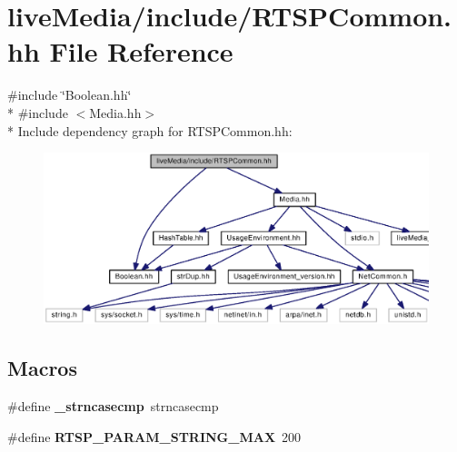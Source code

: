 \section{live\+Media/include/\+R\+T\+S\+P\+Common.hh File Reference}
\label{RTSPCommon_8hh}
{\ttfamily \#include \char`\"{}Boolean.\+hh\char`\"{}}\\*
{\ttfamily \#include $<$Media.\+hh$>$}\\*
Include dependency graph for R\+T\+S\+P\+Common.\+hh\+:
\nopagebreak
\begin{figure}[H]
\begin{center}
\leavevmode
\includegraphics[width=350pt]{RTSPCommon_8hh__incl}
\end{center}
\end{figure}
\subsection*{Macros}
\begin{DoxyCompactItemize}
\item 
\#define {\bf \+\_\+strncasecmp}~strncasecmp
\item 
\#define {\bf R\+T\+S\+P\+\_\+\+P\+A\+R\+A\+M\+\_\+\+S\+T\+R\+I\+N\+G\+\_\+\+M\+A\+X}~200
\end{DoxyCompactItemize}

